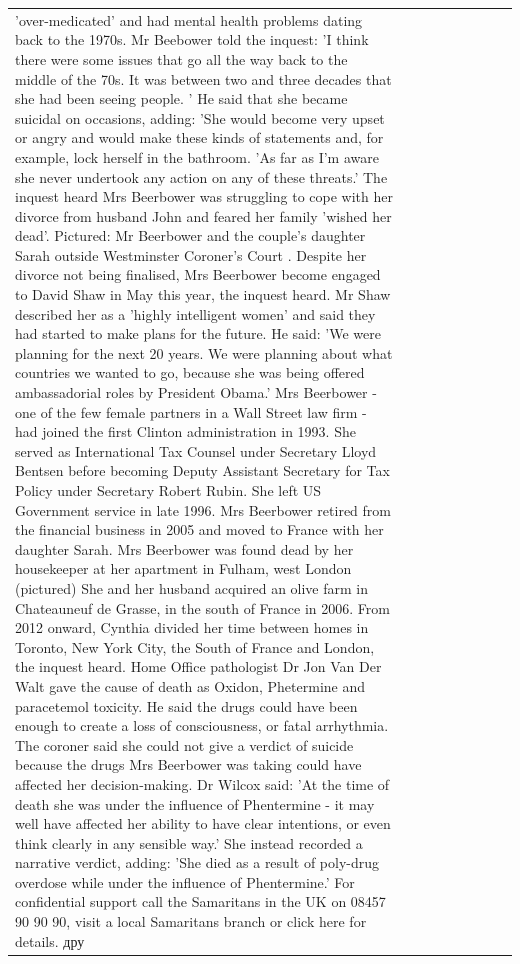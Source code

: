\begin{table}[H]
\begin{tabular}{lllrlllll}
'over-medicated' and had mental health problems dating back to the 1970s. Mr Beebower told the inquest: 'I think there were some issues that go all the way back to the middle of the 70s. It was between two and three decades that she had been seeing people. ' He said that she became suicidal on occasions, adding: 'She would become very upset or angry and would make these kinds of statements and, for example, lock herself in the bathroom. 'As far as I'm aware she never undertook any action on any of these threats.' The inquest heard Mrs Beerbower was struggling to cope with her divorce from husband John and feared her family 'wished her dead'. Pictured: Mr Beerbower and the couple's daughter Sarah outside Westminster Coroner's Court . Despite her divorce not being finalised, Mrs Beerbower become engaged to David Shaw in May this year, the inquest heard. Mr Shaw described her as a 'highly intelligent women' and said they had started to make plans for the future. He said: 'We were planning for the next 20 years. We were planning about what countries we wanted to go, because she was being offered ambassadorial roles by President Obama.' Mrs Beerbower - one of the few female partners in a Wall Street law firm - had joined the first Clinton administration in 1993. She served as International Tax Counsel under Secretary Lloyd Bentsen before becoming Deputy Assistant Secretary for Tax Policy under Secretary Robert Rubin. She left US Government service in late 1996. Mrs Beerbower retired from the financial business in 2005 and moved to France with her daughter Sarah. Mrs Beerbower was found dead by her housekeeper at her apartment in Fulham, west London (pictured) She and her husband acquired an olive farm in Chateauneuf de Grasse, in the south of France in 2006. From 2012 onward, Cynthia divided her time between homes in Toronto, New York City, the South of France and London, the inquest heard. Home Office pathologist Dr Jon Van Der Walt gave the cause of death as Oxidon, Phetermine and paracetemol toxicity. He said the drugs could have been enough to create a loss of consciousness, or fatal arrhythmia. The coroner said she could not give a verdict of suicide because the drugs Mrs Beerbower was taking could have affected her decision-making. Dr Wilcox said: 'At the time of death she was under the influence of Phentermine - it may well have affected her ability to have clear intentions, or even think clearly in any sensible way.' She instead recorded a narrative verdict, adding: 'She died as a result of poly-drug overdose while under the influence of Phentermine.' For confidential support call the Samaritans in the UK on 08457 90 90 90, visit a local Samaritans branch or click here for details. дру \\

\end{tabular}
\end{table}
